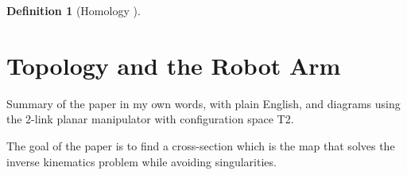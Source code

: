 \documentclass[12pt]{article}
\theoremstyle{definition}
\newtheorem{defn}{Definition}
\begin{document}
\begin{defn}[Homology \cite{intro-top-manifolds}]

\end{defn}


\section{Topology and the Robot Arm}
Summary of the paper in my own words, with plain English, and diagrams using the
2-link planar manipulator with configuration space T2.

The goal of the paper is to find a cross-section which is the map
that solves the inverse kinematics problem while avoiding singularities.
\printbibliography
\end{document}
